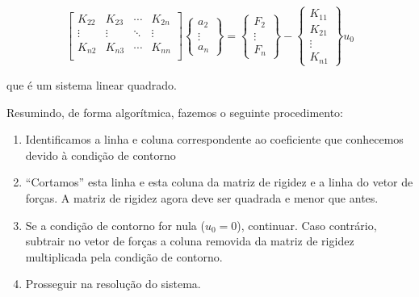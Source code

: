         \begin{equation*}
            \begin{bmatrix}
                K_{22} & K_{23} & \cdots & K_{2n}\\
                \vdots & \vdots & \ddots & \vdots\\
                K_{n2} & K_{n3} & \cdots & K_{nn}\\
            \end{bmatrix}
            \begin{Bmatrix}
                a_2 \\
                \vdots\\
                a_n
            \end{Bmatrix}
            =
             \begin{Bmatrix}
                F_2\\
                \vdots\\
                F_n
            \end{Bmatrix}
            -
            \begin{Bmatrix}
                K_{11}\\
                K_{21} \\
                \vdots\\
                K_{n1}
            \end{Bmatrix}
            u_0
        \end{equation*}

        \noindent que é um sistema linear quadrado.

        Resumindo, de forma algorítmica, fazemos o seguinte procedimento:

        \begin{enumerate}
            \item Identificamos a linha e coluna correspondente ao coeficiente que conhecemos devido à condição de contorno
            \item ``Cortamos'' esta linha e esta coluna da matriz de rigidez e a linha do vetor de forças. A matriz de rigidez agora deve ser quadrada e menor que antes.
            \item Se a condição de contorno for nula ($u_0=0$), continuar. Caso contrário, subtrair no vetor de forças a coluna removida da matriz de rigidez multiplicada pela condição de contorno.
            \item Prosseguir na resolução do sistema. 
        \end{enumerate}




